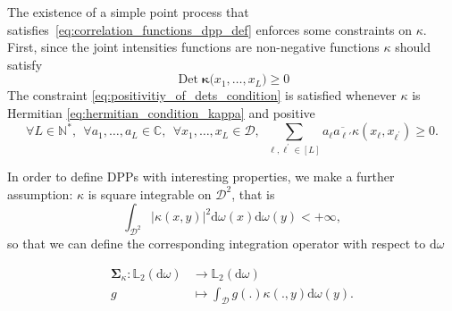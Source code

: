 \documentclass[twoside,11pt]{book}
\numberwithin{theorem}{chapter}
\numberwithin{definition}{chapter}
\numberwithin{proposition}{chapter}
\numberwithin{corollary}{chapter}
\numberwithin{example}{chapter}
\numberwithin{lemma}{chapter}
\numberwithin{assumption}{chapter}
\DeclareMathOperator{\Det}{Det}
\begin{document}
The existence of a simple point process that satisfies~\eqref{eq:correlation_functions_dpp_def} enforces some constraints on $\kappa$. First, since the joint intensities functions are non-negative functions $\kappa$ should satisfy 
\begin{equation}\label{eq:positivitiy_of_dets_condition}
\Det \bm{\kappa}\big(x_{1}, \dots, x_{L} \big) \geq 0 %
\end{equation}
The constraint \eqref{eq:positivitiy_of_dets_condition} is satisfied whenever $\kappa$ is Hermitian \eqref{eq:hermitian_condition_kappa}
and positive
\begin{equation}\label{eq:positivity_condition_kappa}
\forall L \in \mathbb{N}^{*}, \:\:\forall a_{1}, \dots, a_{L} \in \mathbb{C}, \:\:\forall x_{1}, \dots, x_{L} \in \mathcal{D}, \:\: \sum\limits_{\ell,\ell^{'} \in [L]} a_{\ell}\overline{a_{\ell'}} \kappa(x_{\ell},x_{\ell^{'}}) \geq 0.
\end{equation} 





In order to define DPPs with interesting properties, we make a further assumption: $\kappa$ is square integrable on $\mathcal{D}^{2}$, that is 
\begin{equation}\label{eq:integrability_condition_kappa}
\int_{\mathcal{D}^{2}} |\kappa(x,y)|^{2} \mathrm{d}\omega(x) \mathrm{d}\omega(y) < +\infty,
\end{equation}
so that we can define the corresponding integration operator with respect to $\mathrm{d}\omega$



\begin{align}
  \bm{\Sigma}_{\kappa} : \mathbb{L}_{2}(\mathrm{d}\omega) & \longrightarrow \mathbb{L}_{2}(\mathrm{d}\omega) \nonumber \\
  g & \longmapsto \int_{\mathcal{D}}g(.) \kappa(.,y) \mathrm{d}\omega(y). \nonumber
\end{align}
\end{document}
